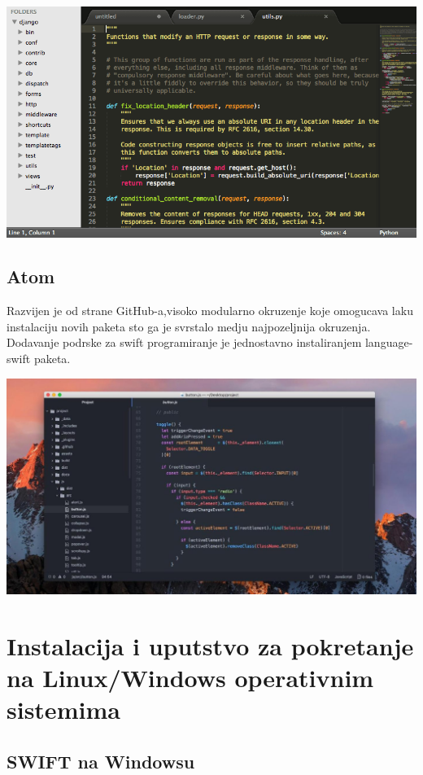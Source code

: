 \documentclass[a4paper]{article}
\begin{document}
\includegraphics[scale=0.3]{sublime.png}

\subsection{Atom}
\label{subsec:podnaslovAtom}
\vspace{5mm}
Razvijen je od strane GitHub-a,visoko modularno okruzenje koje omogucava laku instalaciju novih paketa sto ga je svrstalo medju najpozeljnija okruzenja. Dodavanje podrske za swift programiranje je jednostavno instaliranjem language-swift paketa.

\vspace{5mm}

\includegraphics[scale=0.2]{atom.jpg}
\vspace{20mm}

\section{Instalacija i uputstvo za pokretanje na Linux/Windows operativnim sistemima }	
\label{sec:petiDeo}

\subsection{SWIFT na Windowsu}
\label{subsec:podnaslovWindows}
\end{document}
